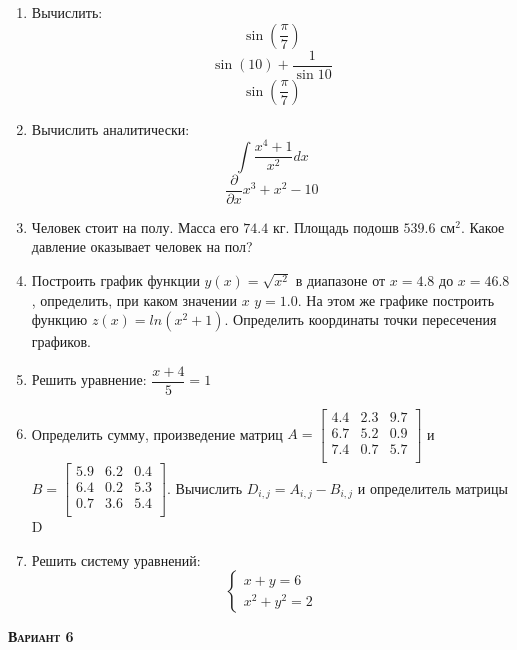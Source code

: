 \begin{enumerate}
\item Вычислить: 
\begin{equation*}\sin \left( \dfrac{\pi}{7} \right)\end{equation*}
\begin{equation*}\sin(10)+\dfrac{1}{\sin{10}}      \end{equation*}
\begin{equation*}\sin \left( \dfrac{\pi}{7} \right)\end{equation*}

\item Вычислить аналитически: 
 \begin{equation*} \int \dfrac{x^4+1}{x^2} dx \end{equation*}\begin{equation*} \dfrac{\partial} {\partial x} x^3 +x^2-10           \end{equation*}


\item Человек стоит на полу. Масса его $74.4$ кг. Площадь подошв $539.6$ $\text{см}^2$. Какое давление оказывает человек на пол?

\item Построить график функции $y(x)=\sqrt{x^2}            $ в диапазоне от $x=4.8$ до $x=46.8$, определить, при каком значении $x$ $y=1.0$. На этом же графике построить функцию $z(x)=ln(x^2+1)                 $. Определить координаты точки пересечения графиков. \item Решить уравнение: $\dfrac{x+4}{5}=1     $

\item Определить сумму, произведение матриц $A=\begin{bmatrix}
4.4 &2.3 &9.7 \\
6.7 &5.2 &0.9 \\
7.4 &0.7 &5.7 \\
\end{bmatrix}
$ и $B=\begin{bmatrix}
5.9 &6.2 &0.4 \\
6.4 &0.2 &5.3 \\
0.7 &3.6 &5.4 \\
\end{bmatrix}
$. Вычислить $D_{i,j}=A_{i,j}  -  B_{i,j}$ и определитель матрицы D

\item Решить систему уравнений: \begin{equation*} \begin{cases} x+y=6                \\ x^2+y^2=2                 \end{cases} \end{equation*} 

\end{enumerate}
\textsc{\textbf{Вариант 6}}

